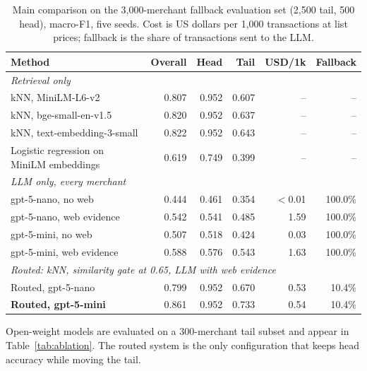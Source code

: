 \begin{table}[t]
\centering
\caption{Main comparison on the 3,000-merchant fallback evaluation set (2,500 tail, 500 head), macro-F1, five seeds. Cost is US dollars per 1,000 transactions at list prices; fallback is the share of transactions sent to the LLM.}
\label{tab:main}
\begin{tabular}{lrrrrr}
\toprule
Method & Overall & Head & Tail & USD/1k & Fallback\\
\midrule
\multicolumn{6}{l}{\textit{Retrieval only}} \\
kNN, MiniLM-L6-v2 & 0.807 & 0.952 & 0.607 & -- & -- \\
kNN, bge-small-en-v1.5 & 0.820 & 0.952 & 0.637 & -- & -- \\
kNN, text-embedding-3-small & 0.822 & 0.952 & 0.643 & -- & -- \\
Logistic regression on MiniLM embeddings & 0.619 & 0.749 & 0.399 & -- & -- \\
\multicolumn{6}{l}{\textit{LLM only, every merchant}} \\
gpt-5-nano, no web & 0.444 & 0.461 & 0.354 & $<$0.01 & 100.0\% \\
gpt-5-nano, web evidence & 0.542 & 0.541 & 0.485 & 1.59 & 100.0\% \\
gpt-5-mini, no web & 0.507 & 0.518 & 0.424 & 0.03 & 100.0\% \\
gpt-5-mini, web evidence & 0.588 & 0.576 & 0.543 & 1.63 & 100.0\% \\
\multicolumn{6}{l}{\textit{Routed: kNN, similarity gate at 0.65, LLM with web evidence}} \\
Routed, gpt-5-nano & 0.799 & 0.952 & 0.670 & 0.53 & 10.4\% \\
\textbf{Routed, gpt-5-mini} & 0.861 & 0.952 & 0.733 & 0.54 & 10.4\% \\
\bottomrule
\end{tabular}
\vspace{4pt}
\begin{minipage}{0.86\textwidth}\footnotesize Open-weight models are evaluated on a 300-merchant tail subset and appear in Table~\ref{tab:ablation}. The routed system is the only configuration that keeps head accuracy while moving the tail.\end{minipage}
\end{table}
